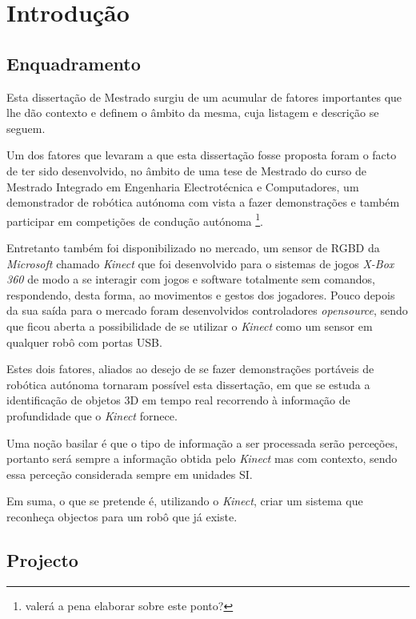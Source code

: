 \chapter{Introdução} \label{chap:intro}

\section{Enquadramento} \label{sec:context}

Esta dissertação de Mestrado surgiu de um acumular de fatores importantes que lhe dão contexto e definem o âmbito da mesma, cuja listagem e descrição se seguem.

Um dos fatores que levaram a que esta dissertação fosse proposta foram o facto de ter sido desenvolvido, no âmbito de uma tese de Mestrado do curso de Mestrado Integrado em Engenharia Electrotécnica e Computadores, um demonstrador de robótica autónoma com vista a fazer demonstrações e também participar em competições de condução autónoma \footnote{valerá a pena elaborar sobre este ponto?}. 

Entretanto também foi disponibilizado no mercado, um sensor de RGBD da \emph{Microsoft} chamado \emph{Kinect} que foi desenvolvido para o sistemas de jogos \emph{X-Box 360} de modo a se interagir com jogos e software totalmente sem comandos, respondendo, desta forma, ao movimentos e gestos dos jogadores. Pouco depois da sua saída para o mercado foram desenvolvidos controladores \emph{opensource}, sendo que ficou aberta a possibilidade de se utilizar o \emph{Kinect} como um sensor em qualquer robô com portas USB.

Estes dois fatores, aliados ao desejo de se fazer demonstrações portáveis de robótica autónoma tornaram possível esta dissertação, em que se estuda a identificação de objetos 3D em tempo real recorrendo à informação de profundidade que o \emph{Kinect} fornece.

Uma noção basilar é que o tipo de informação a ser processada serão perceções, portanto será sempre a informação obtida pelo \emph{Kinect} mas com contexto, sendo essa perceção considerada sempre em unidades SI.

Em suma, o que se pretende é, utilizando o \emph{Kinect}, criar um sistema que reconheça objectos para um robô que já existe.

\section{Projecto} \label{sec:proj}

